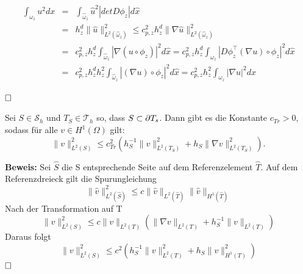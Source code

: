 \begin{itemize}
	\begin{eqnarray*}
		\int_{\omega_z} u^2dx&=& \int_{\widehat{\omega}_z} \widehat{u}^2 | detD\phi_z|d\hat{x} \\
		&=& h_z^d\|\widehat{u}\|^2_{L^2(\widehat{\omega}_z)} \leq c^2_{p,z}h^d_z\|\nabla \widehat{u}\|^2_{L^2(\widehat{\omega}_z)} \\
		&=&c^2_{p,z}h^d_z\int_{\widehat{\omega}_z}| \nabla (u\circ\phi_z)|^2 d\hat{x} = c^2_{p,z}h^d_z \int_{\widehat{\omega}_z}|D\phi_z^\top(\nabla u)\circ\phi_z|^2 d\hat{x} \\
		&=& c^2_{p,z}h^d_zh^2_z\int_{\widehat{\omega}_z}|(\nabla u)\circ\phi_z|^2d\hat{x} 
		=c^2_{p,z}h^2_z\int_{\omega_z}|\nabla u|^2dx
	\end{eqnarray*} 
\end{itemize}
$\hfill \Box$

\begin{lemma}
	Sei $S \in  \mathcal{S}_h$ und $T_S \in \mathscr{T}_h$ so, dass $S \subset \partial T_s$. Dann
	gibt es die Konstante $c_{Tr} > 0$, sodass für alle $v\in H^1(\Omega)$ gilt:
	\[
	\|v\|^2_{L^2(S)} \leq c^2_{Tr}(h_S^{-1}\|v\|^2_{L^2(T_S)}+h_S\|\nabla v\|^2_{L^2(T_S)}).
	\]
\end{lemma}
\textbf{Beweis:}
Sei $\hat{S}$ die S entsprechende Seite auf dem Referenzelement $\hat{T}$. Auf dem Referenzdreieck gilt die Spurungleichung
\[
\|\hat{v}\|^2_{L^2(\hat{S})} \leq c\|\hat{v}\|_{L^2(\hat{T})}\|\hat{v}\|_{H^1(\hat{T})}
\]
Nach der Transformation auf T
\[
\|v\|^2_{L^2(S)} \leq c\|v\|_{L^2(T)}(\|\nabla v\|_{L^2(T)}+h_S^{-1}\|v\|_{L^2(T)})
\]
Daraus folgt
\[
\|v\|^2_{L^2(S)} \leq c^2(h_S^{-1}\|v\|^2_{L^2(T)}+h_S\|v\|^2_{H^1(T)})
\]
$\hfill \Box$
